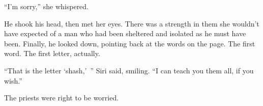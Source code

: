 “I’m sorry,” she whispered.

He shook his head, then met her eyes. There was a strength in them she wouldn’t have expected of a man who had been sheltered and isolated as he must have been. Finally, he looked down, pointing back at the words on the page. The first word. The first letter, actually.

“That is the letter ‘shash,’~” Siri said, smiling. “I can teach you them all, if you wish.”

The priests were right to be worried.

